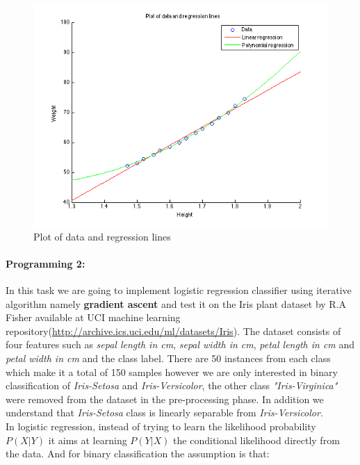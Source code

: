 \documentclass[a4paper]{article}
\begin{document}
	\begin{figure}[H]
		\centering
		\includegraphics[scale=.57]{images/regression.png}
		\caption{Plot of data and regression lines}
		\label{fig:regression}
	\end{figure}
	
\paragraph{Programming 2:} In this task we are going to implement logistic regression classifier using iterative algorithm namely \textbf{gradient ascent} and test it on the Iris plant dataset by R.A Fisher available at UCI machine learning repository(\url{http://archive.ics.uci.edu/ml/datasets/Iris}). The dataset consists of four features such as \emph{sepal length in cm}, \emph{sepal width in cm}, \emph{petal length in cm} and \emph{petal width in cm} and the class label. There are 50 instances from each class which make it a total of 150 samples however we are only interested in binary classification of \emph{Iris-Setosa} and \emph{Iris-Versicolor}, the other class \emph{"Iris-Virginica"} were removed from the dataset in the pre-processing phase. In addition we understand that \emph{Iris-Setosa} class is linearly separable from \emph{Iris-Versicolor}. \\ 

	In logistic regression, instead of trying to learn the likelihood probability $P(X|Y)$ it aims at learning $P(Y|X)$ the conditional likelihood directly from the data. And for binary classification the assumption is that:
	
\end{document}
